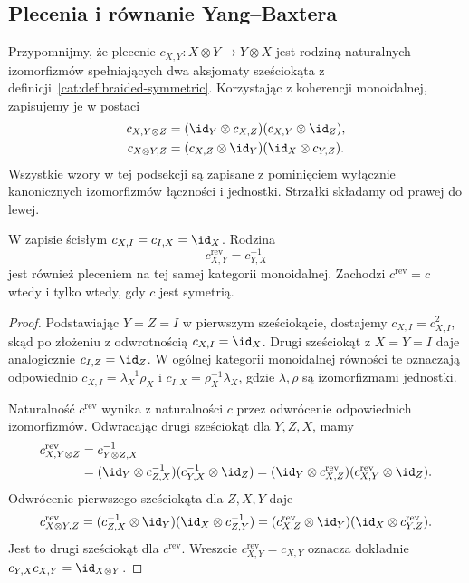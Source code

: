\subsection{Plecenia i równanie Yang--Baxtera}

Przypomnijmy, że plecenie $c_{X,Y}:X\otimes Y\to Y\otimes X$ jest rodziną naturalnych izomorfizmów spełniających dwa aksjomaty sześciokąta z definicji~\ref{cat:def:braided-symmetric}. Korzystając z koherencji monoidalnej, zapisujemy je w postaci
\begin{align}
 c_{X,Y\otimes Z}
 &=(\id_Y\otimes c_{X,Z})(c_{X,Y}\otimes\id_Z),
 \label{cat:eq:tf-hexagon-one}\\
 c_{X\otimes Y,Z}
 &=(c_{X,Z}\otimes\id_Y)(\id_X\otimes c_{Y,Z}).
 \label{cat:eq:tf-hexagon-two}
\end{align}
Wszystkie wzory w tej podsekcji są zapisane z pominięciem wyłącznie kanonicznych izomorfizmów łączności i jednostki. Strzałki składamy od prawej do lewej.

\begin{stwierdzenie}\label{cat:prop:tf-reverse-braiding}
W zapisie ścisłym $c_{X,I}=c_{I,X}=\id_X$. Rodzina
\[
 c^{\mathrm{rev}}_{X,Y}=c_{Y,X}^{-1}
\]
jest również pleceniem na tej samej kategorii monoidalnej. Zachodzi $c^{\mathrm{rev}}=c$ wtedy i tylko wtedy, gdy $c$ jest symetrią.
\end{stwierdzenie}
\begin{proof}
Podstawiając $Y=Z=I$ w pierwszym sześciokącie, dostajemy $c_{X,I}=c_{X,I}^2$, skąd po złożeniu z odwrotnością $c_{X,I}=\id_X$. Drugi sześciokąt z $X=Y=I$ daje analogicznie $c_{I,Z}=\id_Z$. W ogólnej kategorii monoidalnej równości te oznaczają odpowiednio $c_{X,I}=\lambda_X^{-1}\rho_X$ i $c_{I,X}=\rho_X^{-1}\lambda_X$, gdzie $\lambda,\rho$ są izomorfizmami jednostki.

Naturalność $c^{\mathrm{rev}}$ wynika z naturalności $c$ przez odwrócenie odpowiednich izomorfizmów. Odwracając drugi sześciokąt dla $Y,Z,X$, mamy
\[
\begin{aligned}
 c^{\mathrm{rev}}_{X,Y\otimes Z}
 &=c_{Y\otimes Z,X}^{-1}\\
 &=(\id_Y\otimes c_{Z,X}^{-1})(c_{Y,X}^{-1}\otimes\id_Z)
 =(\id_Y\otimes c^{\mathrm{rev}}_{X,Z})(c^{\mathrm{rev}}_{X,Y}\otimes\id_Z).
\end{aligned}
\]
Odwrócenie pierwszego sześciokąta dla $Z,X,Y$ daje
\[
 c^{\mathrm{rev}}_{X\otimes Y,Z}
 =(c_{Z,X}^{-1}\otimes\id_Y)(\id_X\otimes c_{Z,Y}^{-1})
 =(c^{\mathrm{rev}}_{X,Z}\otimes\id_Y)(\id_X\otimes c^{\mathrm{rev}}_{Y,Z}).
\]
Jest to drugi sześciokąt dla $c^{\mathrm{rev}}$. Wreszcie $c^{\mathrm{rev}}_{X,Y}=c_{X,Y}$ oznacza dokładnie $c_{Y,X}c_{X,Y}=\id_{X\otimes Y}$.
\end{proof}

